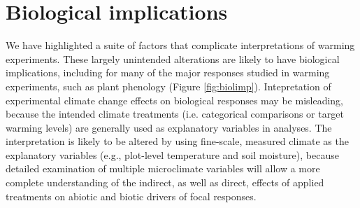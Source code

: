 \documentclass{article}
\begin{document}
\section* {Biological implications}


\par We have highlighted a suite of factors that complicate interpretations of warming experiments. These largely unintended alterations are likely to have biological implications, including for many of the major responses studied in warming experiments, such as plant phenology (Figure \ref{fig:biolimp}). Intepretation of experimental climate change effects on biological responses may be misleading, because the intended climate treatments (i.e. categorical comparisons or target warming levels) are generally used as explanatory variables in analyses. The interpretation is likely to be altered by using fine-scale, measured climate as the explanatory variables (e.g., plot-level temperature and soil moisture), because detailed examination of multiple microclimate variables will allow a more complete understanding of the indirect, as well as direct, effects of applied treatments on abiotic and biotic drivers of focal responses.
\end{document}
